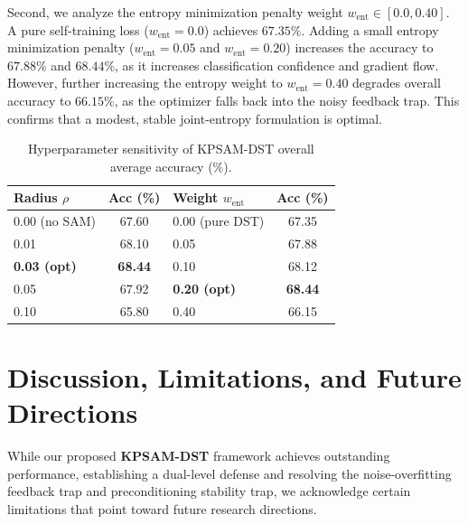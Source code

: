 \documentclass{article}
\theoremstyle{plain}
\theoremstyle{definition}
\theoremstyle{remark}
\begin{document}
Second, we analyze the entropy minimization penalty weight $w_{\text{ent}} \in [0.0, 0.40]$. A pure self-training loss ($w_{\text{ent}} = 0.0$) achieves $67.35\%$. Adding a small entropy minimization penalty ($w_{\text{ent}} = 0.05$ and $w_{\text{ent}} = 0.20$) increases the accuracy to $67.88\%$ and $68.44\%$, as it increases classification confidence and gradient flow. However, further increasing the entropy weight to $w_{\text{ent}} = 0.40$ degrades overall accuracy to $66.15\%$, as the optimizer falls back into the noisy feedback trap. This confirms that a modest, stable joint-entropy formulation is optimal.

\begin{table}[t]
\caption{Hyperparameter sensitivity of KPSAM-DST overall average accuracy (\%).}
\label{tab:sensitivity}
\vskip 0.15in
\begin{center}
\begin{small}
\begin{sc}
\setlength{\tabcolsep}{3.5pt}
\begin{tabular}{lc|lc}
\toprule
Radius $\rho$ & Acc (\%) & Weight $w_{\text{ent}}$ & Acc (\%) \\
\midrule
0.00 (no SAM) & 67.60 & 0.00 (pure DST) & 67.35 \\
0.01          & 68.10 & 0.05          & 67.88 \\
\textbf{0.03 (opt)} & \textbf{68.44} & 0.10          & 68.12 \\
0.05          & 67.92 & \textbf{0.20 (opt)} & \textbf{68.44} \\
0.10          & 65.80 & 0.40          & 66.15 \\
\bottomrule
\end{tabular}
\end{sc}
\end{small}
\end{center}
\vskip -0.1in
\end{table}

\section{Discussion, Limitations, and Future Directions}
\label{sec:discussion}
While our proposed \textbf{KPSAM-DST} framework achieves outstanding performance, establishing a dual-level defense and resolving the noise-overfitting feedback trap and preconditioning stability trap, we acknowledge certain limitations that point toward future research directions.
\end{document}
